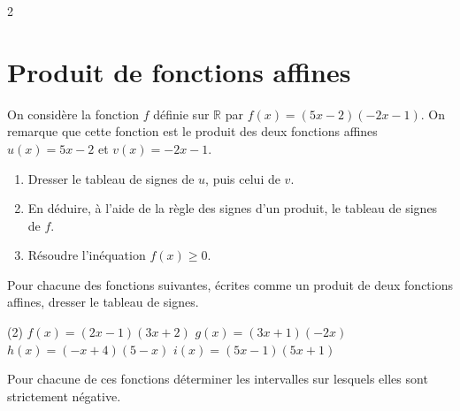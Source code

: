 \documentclass[10pt,a4paper]{article}
\begin{document}
\begin{multicols}{2}
\begin{exo}[][avance]
\begin{enumerate}[leftmargin=*]
    \end{enumerate}
\end{exo}

\section{Produit de fonctions affines}



\begin{exo}[Rappels][]
On considère la fonction \(f\) définie sur \(\mathbb{R}\) par \(f(x)=(5x-2)(-2x-1)\). On remarque que cette fonction est le produit des deux fonctions affines \(u(x)=5x-2\) et \(v(x)=-2x-1\).

\begin{enumerate}[leftmargin=*]
    \item Dresser le tableau de signes de \(u\), puis celui de \(v\).
    \item En déduire, à l'aide de la règle des signes d'un produit, le tableau de signes de \(f\).
    \item Résoudre l'inéquation \(f(x) \geq 0\).
\end{enumerate}
\end{exo}

\begin{exo}[][]
Pour chacune des fonctions suivantes, écrites comme un produit de deux fonctions affines, dresser le tableau de signes.

\begin{tasks}(2)
    \task \(f(x)=(2x-1)(3x+2)\)
    \task \(g(x)=(3x+1)(-2x)\)
    \task \(h(x)=(-x+4)(5-x)\)
    \task \(i(x)=(5x-1)(5x+1)\)
\end{tasks}

Pour chacune de ces fonctions déterminer les intervalles sur lesquels elles sont strictement négative.

\end{exo}


\end{multicols}
\end{document}
